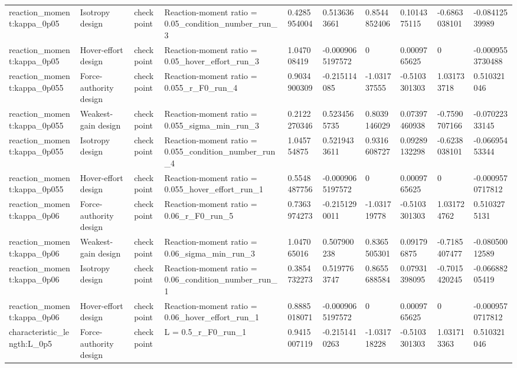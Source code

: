 \begin{tabular}{@{}llllllllll@{}}
reaction\_moment:kappa\_0p05 & Isotropy design & checkpoint & Reaction-moment ratio = 0.05\_condition\_number\_run\_3 & 0.4285954004 & 0.5136363661 & 0.8544852406 & 0.1014375115 & -0.6863038101 & -0.08412539989 \\
reaction\_moment:kappa\_0p05 & Hover-effort design & checkpoint & Reaction-moment ratio = 0.05\_hover\_effort\_run\_3 & 1.047008419 & -0.0009065197572 & 0 & 0.0009765625 & 0 & -0.0009553730488 \\
reaction\_moment:kappa\_0p055 & Force-authority design & checkpoint & Reaction-moment ratio = 0.055\_r\_F0\_run\_4 & 0.9034900309 & -0.215114085 & -1.031737555 & -0.5103301303 & 1.031733718 & 0.510321046 \\
reaction\_moment:kappa\_0p055 & Weakest-gain design & checkpoint & Reaction-moment ratio = 0.055\_sigma\_min\_run\_3 & 0.2122270346 & 0.5234565735 & 0.8039146029 & 0.07397460938 & -0.7590707166 & -0.07022333145 \\
reaction\_moment:kappa\_0p055 & Isotropy design & checkpoint & Reaction-moment ratio = 0.055\_condition\_number\_run\_4 & 1.045754875 & 0.5219433611 & 0.9316608727 & 0.09289132298 & -0.6238038101 & -0.06695453344 \\
reaction\_moment:kappa\_0p055 & Hover-effort design & checkpoint & Reaction-moment ratio = 0.055\_hover\_effort\_run\_1 & 0.5548487756 & -0.0009065197572 & 0 & 0.0009765625 & 0 & -0.0009570717812 \\
reaction\_moment:kappa\_0p06 & Force-authority design & checkpoint & Reaction-moment ratio = 0.06\_r\_F0\_run\_5 & 0.7363974273 & -0.2151290011 & -1.031719778 & -0.5103301303 & 1.031724762 & 0.5103275131 \\
reaction\_moment:kappa\_0p06 & Weakest-gain design & checkpoint & Reaction-moment ratio = 0.06\_sigma\_min\_run\_3 & 1.047065016 & 0.507900238 & 0.8365505301 & 0.091796875 & -0.7185407477 & -0.08050012589 \\
reaction\_moment:kappa\_0p06 & Isotropy design & checkpoint & Reaction-moment ratio = 0.06\_condition\_number\_run\_1 & 0.3854732273 & 0.5197763747 & 0.8655688584 & 0.07931398095 & -0.7015420245 & -0.06688205419 \\
reaction\_moment:kappa\_0p06 & Hover-effort design & checkpoint & Reaction-moment ratio = 0.06\_hover\_effort\_run\_1 & 0.8885018071 & -0.0009065197572 & 0 & 0.0009765625 & 0 & -0.0009570717812 \\
characteristic\_length:L\_0p5 & Force-authority design & checkpoint & L = 0.5\_r\_F0\_run\_1 & 0.9415007119 & -0.2151410263 & -1.031718228 & -0.5103301303 & 1.031713363 & 0.510321046 \\

\end{tabular}

